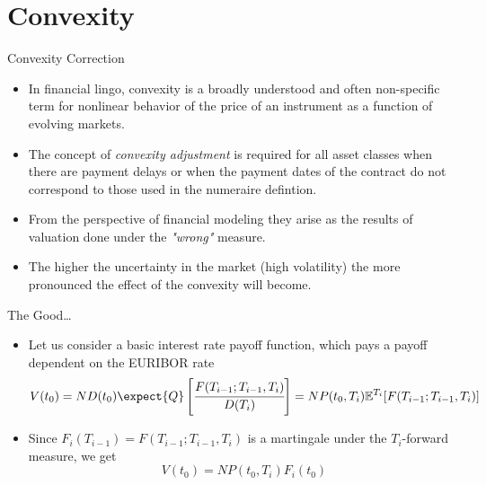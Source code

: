 \documentclass{beamer}
\begin{document}
\section{Convexity}
\begin{frame}{Convexity Correction}
\begin{itemize}
\item<1-> In financial lingo, convexity is a broadly understood and often non-specific term for nonlinear behavior of the price of an instrument as a function of evolving markets.
\item<2-> The concept of \emph{convexity adjustment} is required for all asset classes when there are payment delays or when the payment dates of the contract do
not correspond to those used in the numeraire defintion. %
\item<3-> From the perspective of financial modeling they arise as the results of valuation done under the \emph{"wrong"} measure.
\item<4-> The higher the uncertainty in the market (high volatility) the more pronounced the effect of the convexity will become.
\end{itemize}
\end{frame}

\begin{frame}{The Good\ldots}
\begin{itemize}
\item<1-> Let us consider a basic interest rate payoff function, which pays a payoff dependent on the EURIBOR rate
\begin{equation*}
V(t_0) = N D(t_0)\expect{Q}\left[\cfrac{F(T_{i-1};T_{i-1},T_i)}{D(T_i)}\right]=
	NP(t_0,T_i)\mathbb{E}^{T_i}[F(T_{i-1};T_{i-1},T_i)]
\end{equation*}
\item<2-> Since $F_{i}(T_{i-1}) = F(T_{i-1};T_{i-1}, T_i)$ is a martingale under the $T_i$-forward measure, we get
\begin{equation*}
V(t_0)= NP(t_0,T_i)F_i(t_0)
\end{equation*}
\end{itemize}
\end{frame}
\end{document}
